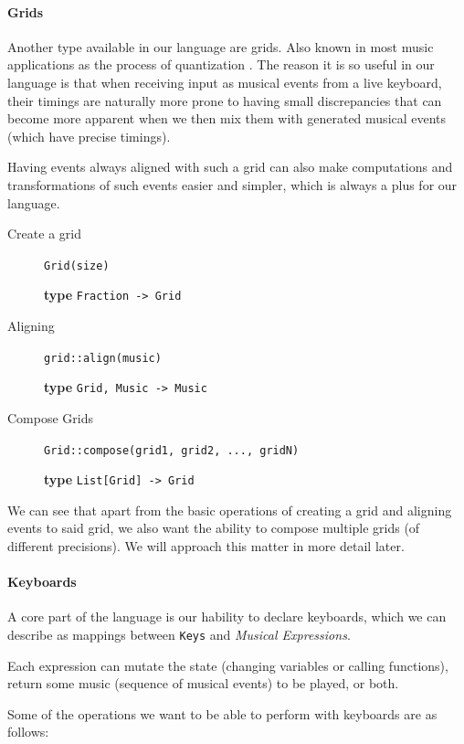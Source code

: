 \documentclass[a4paper,UKenglish,cleveref, autoref]{oasics-v2019}
\begin{document}
\paragraph*{Grids}
Another type available in our language are grids. Also known in most music applications as the process of quantization \cite{Quantization}. The reason it is so useful in our language is that when receiving input as musical events from a live keyboard, their timings are naturally more prone to having small discrepancies that can become more apparent when we then mix them with generated musical events (which have precise timings).


Having events always aligned with such a grid can also make computations and transformations of such events easier and simpler, which is always a plus for our language.


\begin{description}
    \item[Create a grid] \verb|Grid(size)|
    
        \textbf{type} \verb|Fraction -> Grid|
    \item[Aligning] \verb'grid::align(music)'
        
        \textbf{type} \verb|Grid, Music -> Music|
    \item[Compose Grids] \verb'Grid::compose(grid1, grid2, ..., gridN)'
        
        \textbf{type} \verb|List[Grid] -> Grid|
\end{description}

We can see that apart from the basic operations of creating a grid and aligning events to said grid, we also want the ability to compose multiple grids (of different precisions). We will approach this matter in more detail later.

\paragraph*{Keyboards}
A core part of the language is our hability to declare keyboards, which we can describe as mappings between \texttt{Keys} and \textit{Musical Expressions}.

Each expression can mutate the state (changing variables or calling functions), return some music (sequence of musical events) to be played, or both.

Some of the operations we want to be able to perform with keyboards are as follows:
\end{document}
